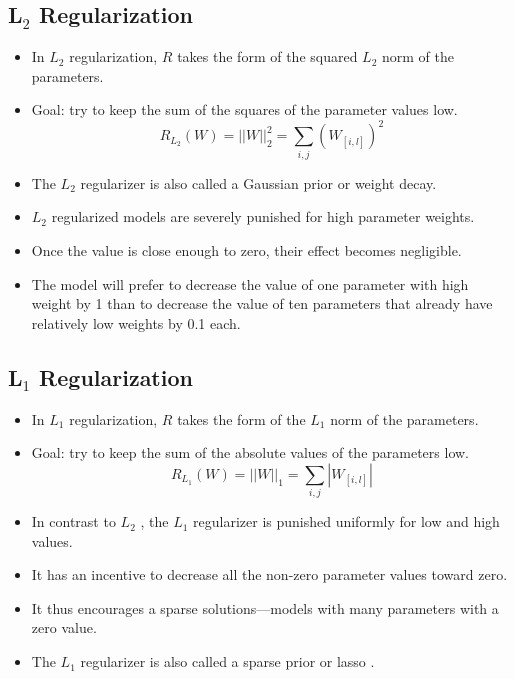 \subsection{L$_2$ Regularization}
\begin{itemize}
\item  In $L_2$ regularization, $R$ takes the form of the squared $L_2$ norm of the parameters.
\item Goal: try to keep the sum of the squares of the parameter values low.
  \begin{displaymath}
   R_{L_{2}}(W) = ||W||^{2}_{2} = \sum_{i,j}(W_{[i,l]})^2
  \end{displaymath}
\item The $L_2$ regularizer is also called a Gaussian prior or weight decay.
\item $L_2$ regularized models are severely punished for high parameter weights.
\item Once the value is close enough to zero, their effect becomes negligible.
\item The model will prefer to decrease the value of one parameter with high weight by 1 than to decrease the value of ten parameters that already have relatively low weights by 0.1 each.
\end{itemize}


\subsection{L$_1$ Regularization}
\begin{itemize}
  \item  In $L_1$ regularization, $R$ takes the form of the $L_1$ norm of the parameters.
  \item Goal: try to keep the sum of the absolute values of the parameters low.
  \begin{displaymath}
   R_{L_{1}}(W) = ||W||_{1} = \sum_{i,j} |W_{[i,l]}|
  \end{displaymath}
 \item In contrast to $L_2$ , the $L_1$ regularizer is punished uniformly for low and high values.
 \item It has an incentive to decrease all the non-zero parameter values toward zero. 
 \item It thus encourages a sparse solutions—models with many parameters with a zero value. 
 \item The $L_1$ regularizer is also called a sparse prior or lasso \cite{tibshirani1996regression}. 
  \end{itemize}


